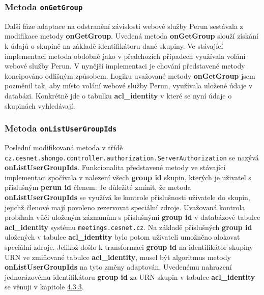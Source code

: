 \documentclass[
  printed, %
  twoside, %
  table,   %
  nolof,     %
  nolot,     %
]{fithesis3}
\begin{document}
\subsubsection{Metoda \texttt{onGetGroup}}

Další fáze adaptace na odstranění závislosti webové služby Perun sestávala z modifikace metody \textbf{onGetGroup}. Uvedená metoda \textbf{onGetGroup} slouží získání k údajů o skupině na základě identifikátoru dané skupiny. Ve stávající implementaci metoda obdobně jako v předchozích případech využívala volání webové služby Perun. V nynější implementaci je chování představené metody koncipováno odlišným způsobem. Logiku uvažované metody \textbf{onGetGroup} jsem pozměnil tak, aby místo volání webové služby Perun, využívala uložené údaje v databázi. Konkrétně jde o tabulku \textbf{acl\_identity} v které se nyní údaje o skupinách vyhledávají. 

\subsubsection{Metoda \texttt{onListUserGroupIds}}
Poslední modifikovaná metoda v třídě \texttt{cz.cesnet.shongo.controller.authorization.ServerAuthorization} se nazývá \textbf{onListUserGroupIds}. Funkcionalita představené metody ve stávající implementaci spočívala v nalezení všech \textbf{group id} skupin, kterých je uživatel s příslušným \textbf{perun id} členem. Je důležité zmínit, že metoda \textbf{onListUserGroupIds} se využívá ke kontrole příslušnosti uživatele do skupin, jejichž členové mají povoleno rezervovat speciální zdroje. Uvažovaná kontrola probíhala vůči uloženým záznamům s příslušnými \textbf{group id} v databázové tabulce \textbf{acl\_identity} systému \texttt{meetings.cesnet.cz}. Na základě příslušných \textbf{group id} uložených v tabulce \textbf{acl\_identity} bylo potom uživateli umožněno alokovat speciální zdroje. Jelikož došlo k transformaci \textbf{group id} na identifikátor skupiny URN ve zmiňované tabulce \textbf{acl\_identity}, musel být algoritmus metody \textbf{onListUserGroupIds} na tyto změny adaptován. Uvedenému nahrazení jednorázovému identifikátoru \textbf{group id} za URN skupin v tabulce \textbf{acl\_identity} se věnuji v kapitole \hyperref[zpracovaniAUlozeniPerun]{4.3.3}. 

\par
\end{document}
